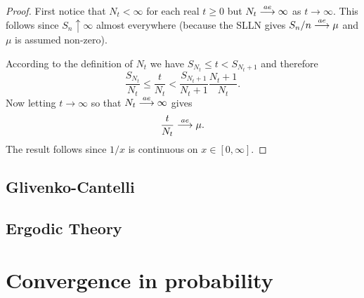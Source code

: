 \begin{proof}
First notice that $N_t<\infty$ for each real $t\geq 0$ but  $N_t\overset{\small ae} \longrightarrow \infty$ as $t \rightarrow \infty$. This follows since  $S_n\uparrow \infty$ almost everywhere (because the SLLN gives $S_n/n\overset{\small ae} \longrightarrow \mu$ and $\mu$ is assumed non-zero). 


According to the definition of $N_t$ we have $S_{N_t}\leq t < S_{N_t+1}$ and therefore
\begin{equation}
\label{eq: renewal thm}
\frac{S_{N_t}}{N_t}\leq \frac{t}{N_t}< \frac{S_{N_t+1}}{N_t+1}\frac{N_t+1}{N_t}.
\end{equation}
Now  letting $t\rightarrow \infty$ so that $N_t\overset{\small ae} \longrightarrow \infty$ gives
\[
 \frac{t}{N_t} \overset{\small ae} \longrightarrow \mu.
\]
The result follows since $1/x$ is continuous on $x\in [0,\infty]$.

\end{proof}






\begin{shaded}



\subsection{Glivenko-Cantelli}

\subsection{Ergodic Theory}
\end{shaded}







\clearpage
\section{Convergence in probability}



